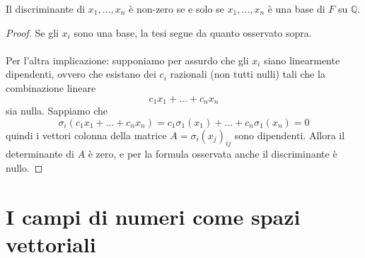 \begin{proposizione}
	Il discriminante di $x_1,\dots,x_n$ è non-zero se e solo se $x_1,\dots,x_n$ è una base di $F$ su $\mathbb{Q}$.
\end{proposizione}
\begin{proof}
	Se gli $x_i$ sono una base, la tesi segue da quanto osservato sopra.
	\\ \\ Per l'altra implicazione: supponiamo per assurdo che gli $x_i$ siano linearmente dipendenti, ovvero che esistano dei $c_i$ razionali (non tutti nulli) tali che la combinazione lineare 
	\begin{equation*}
	c_1x_1+\dots+c_nx_n
	\end{equation*}
	sia nulla. Sappiamo che 
	\begin{equation*}
	\sigma_i\left(c_1x_1+\dots+c_nx_n\right) = c_1\sigma_1(x_1)+\dots+c_n\sigma_1(x_n) = 0
	\end{equation*}
	quindi i vettori colonna della matrice $A=\sigma_i(x_j)_{ij}$ sono dipendenti. Allora il determinante di $A$ è zero, e per la formula osservata anche il discriminante è nullo.
\end{proof}





\section{I campi di numeri come spazi vettoriali}
